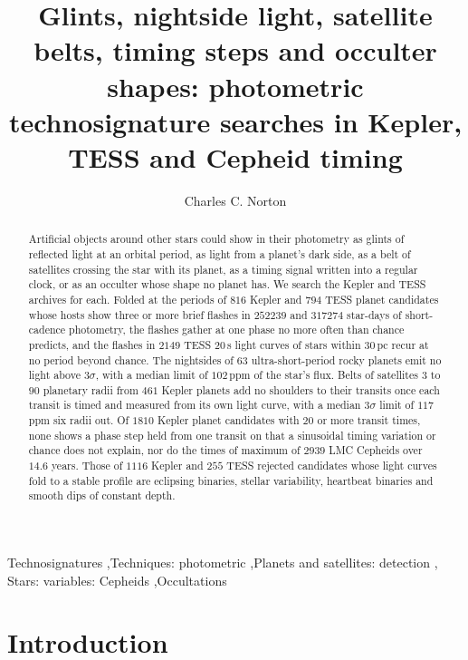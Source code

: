 \documentclass[3p,11pt]{elsarticle}
\begin{document}
\begin{frontmatter}

\title{Glints, nightside light, satellite belts, timing steps and occulter shapes: photometric technosignature searches in Kepler, TESS and Cepheid timing}

\author{Charles C. Norton}

\begin{abstract}
Artificial objects around other stars could show in their photometry as glints of
reflected light at an orbital period, as light from a planet's dark side, as a belt of
satellites crossing the star with its planet, as a timing signal written into a regular
clock, or as an occulter whose shape no planet has. We search the Kepler and TESS
archives for each. Folded at the periods of $816$ Kepler and
$794$ TESS planet candidates whose hosts show three or more brief flashes in $252239$
and $317274$ star-days of short-cadence photometry, the flashes gather at one phase no
more often than chance predicts, and the flashes in $2149$ TESS $20$\,s light curves of
stars within $30$\,pc recur at no period beyond chance. The nightsides of $63$
ultra-short-period rocky planets emit no light above $3\sigma$, with a median limit of
$102$\,ppm of the star's flux. Belts of satellites $3$ to $90$ planetary radii from
$461$ Kepler planets add no shoulders to their transits once each transit is timed and
measured from its own light curve, with a median $3\sigma$ limit of $117$\,ppm six radii
out. Of $1810$ Kepler planet candidates with $20$ or more
transit times, none shows a phase step held from one transit on that a sinusoidal
timing variation or chance does not explain, nor do the times of maximum of $2939$ LMC
Cepheids over $14.6$ years. Those of $1116$ Kepler and $255$ TESS rejected candidates
whose light curves fold to a stable profile are eclipsing binaries, stellar variability,
heartbeat binaries and smooth dips of constant depth.
\end{abstract}

\begin{keyword}
Technosignatures \sep Techniques: photometric \sep Planets and satellites: detection \sep
Stars: variables: Cepheids \sep Occultations
\end{keyword}

\end{frontmatter}

\section{Introduction}\label{sec:intro}
\end{document}
